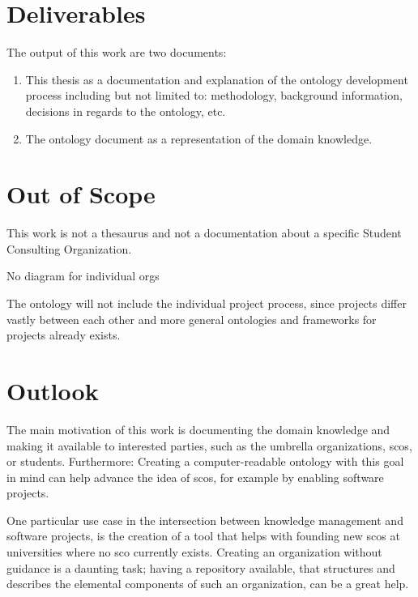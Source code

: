 \documentclass[a4paper, DIV=13, BCOR=0cm]{scrbook}
\begin{document}
\section{Deliverables }
The output of this work are two documents:
\begin{enumerate}
	\item This thesis as a documentation and explanation of the ontology development process including but not limited to: methodology, background information, decisions in regards to the ontology, etc. 
	\item The ontology document as a representation of the domain knowledge.
\end{enumerate}

\section{Out of Scope }
\begin{compactenum}
	\item This work is not a thesaurus and not a documentation about a specific Student Consulting Organization.
	\item No diagram for individual orgs
	\item The ontology will not include the individual project process, since projects differ vastly between each other and more general ontologies and frameworks for projects already exists.
\end{compactenum}

\section{Outlook }
The main motivation of this work is documenting the domain knowledge and making it available to interested parties, such as the umbrella organizations, \glspl{sco}, or students. Furthermore: Creating a computer-readable ontology with this goal in mind can help advance the idea of \glspl{sco}, for example by enabling software projects.

One particular use case in the intersection between knowledge management and software projects, is the creation of a tool that helps with founding new \glspl{sco} at universities where no \gls{sco} currently exists. Creating an organization without guidance is a daunting task; having a repository available, that structures and describes the elemental components of such an organization, can be a great help.
\end{document}
